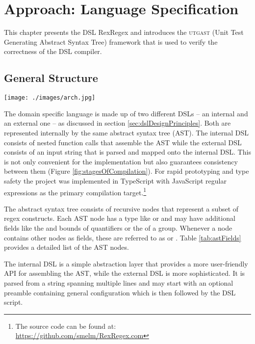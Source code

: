 \chapter{Approach: Language Specification}

This chapter presents the DSL RexRegex and introduces the \textsc{utgast} (Unit Test Generating Abstract Syntax Tree) framework that is used to verify the correctness of the DSL compiler.

\section{General Structure}

\begin{boxFigure}[title={Stages of Compilation},label=fig:stagesOfCompilation]
\texttt{[image: ./images/arch.jpg]}
\end{boxFigure}

The domain specific language is made up of two different DSLs -- an internal and an external one -- as discussed in section \ref{sec:dslDesignPrinciples}. Both are represented internally by the same abstract syntax tree (AST). The internal DSL consists of nested function calls that assemble the AST while the external DSL consists of an input string that is parsed and mapped onto the internal DSL. This is not only convenient for the implementation but also guarantees consistency between them (Figure \ref{fig:stagesOfCompilation}). For rapid prototyping and type safety the project was implemented in TypeScript with JavaScript regular expressions as the primary compilation target.\footnote{The source code can be found at: \url{https://github.com/smelm/RexRegex.com}} 

The abstract syntax tree consists of recursive nodes that represent a subset of regex constructs. Each AST node has a type like  or  and may have additional fields like the  and  bounds of quantifiers or the  of a group. Whenever a node contains other nodes as fields, these are referred to as  or . Table \ref{tab:astFields} provides a detailed list of the AST nodes.

The internal DSL is a simple abstraction layer that provides a more user-friendly API for assembling the AST, while the external DSL is more sophisticated. It is parsed from a string spanning multiple lines and may start with an optional preamble containing general configuration which is then followed by the DSL script.


